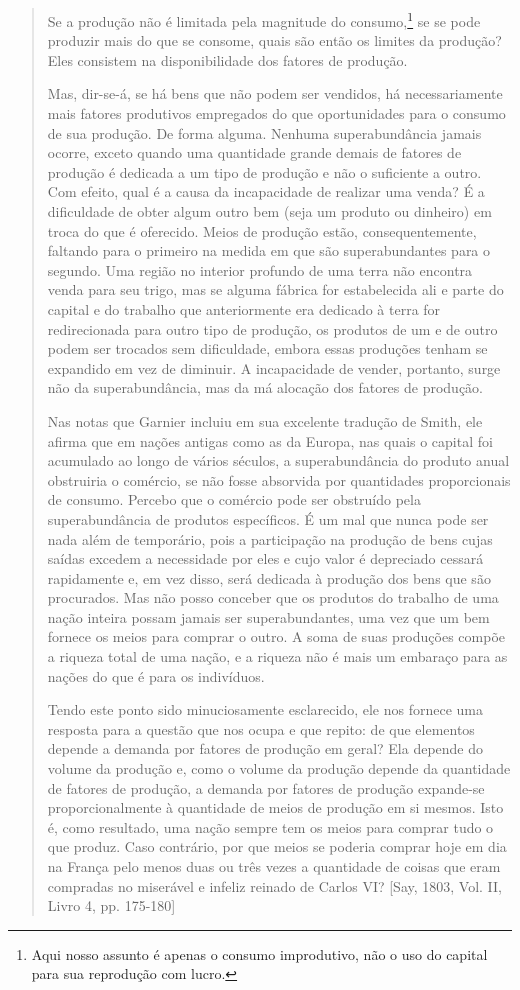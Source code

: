 \documentclass[12pt]{article}
\begin{document}
\begin{quote}
Se a produção não é limitada pela magnitude do consumo,\footnote{Aqui nosso assunto é apenas o consumo improdutivo, não o uso do capital para sua reprodução com lucro.} se se pode produzir mais do que se consome, quais são então os limites da produção? Eles consistem na disponibilidade dos fatores de produção.

Mas, dir-se-á, se há bens que não podem ser vendidos, há necessariamente mais fatores produtivos empregados do que oportunidades para o consumo de sua produção. De forma alguma. Nenhuma superabundância jamais ocorre, exceto quando uma quantidade grande demais de fatores de produção é dedicada a um tipo de produção e não o suficiente a outro. Com efeito, qual é a causa da incapacidade de realizar uma venda? É a dificuldade de obter algum outro bem (seja um produto ou dinheiro) em troca do que é oferecido. Meios de produção estão, consequentemente, faltando para o primeiro na medida em que são superabundantes para o segundo. Uma região no interior profundo de uma terra não encontra venda para seu trigo, mas se alguma fábrica for estabelecida ali e parte do capital e do trabalho que anteriormente era dedicado à terra for redirecionada para outro tipo de produção, os produtos de um e de outro podem ser trocados sem dificuldade, embora essas produções tenham se expandido em vez de diminuir. A incapacidade de vender, portanto, surge não da superabundância, mas da má alocação dos fatores de produção.

Nas notas que Garnier incluiu em sua excelente tradução de Smith, ele afirma que em nações antigas como as da Europa, nas quais o capital foi acumulado ao longo de vários séculos, a superabundância do produto anual obstruiria o comércio, se não fosse absorvida por quantidades proporcionais de consumo. Percebo que o comércio pode ser obstruído pela superabundância de produtos específicos. É um mal que nunca pode ser nada além de temporário, pois a participação na produção de bens cujas saídas excedem a necessidade por eles e cujo valor é depreciado cessará rapidamente e, em vez disso, será dedicada à produção dos bens que são procurados. Mas não posso conceber que os produtos do trabalho de uma nação inteira possam jamais ser superabundantes, uma vez que um bem fornece os meios para comprar o outro. A soma de suas produções compõe a riqueza total de uma nação, e a riqueza não é mais um embaraço para as nações do que é para os indivíduos.

Tendo este ponto sido minuciosamente esclarecido, ele nos fornece uma resposta para a questão que nos ocupa e que repito: de que elementos depende a demanda por fatores de produção em geral? Ela depende do volume da produção e, como o volume da produção depende da quantidade de fatores de produção, a demanda por fatores de produção expande-se proporcionalmente à quantidade de meios de produção em si mesmos. Isto é, como resultado, uma nação sempre tem os meios para comprar tudo o que produz. Caso contrário, por que meios se poderia comprar hoje em dia na França pelo menos duas ou três vezes a quantidade de coisas que eram compradas no miserável e infeliz reinado de Carlos VI? [Say, 1803, Vol. II, Livro 4, pp. 175-180]
\end{quote}
\end{document}
